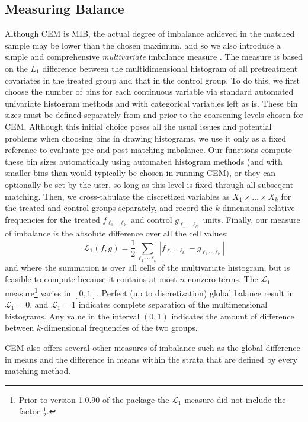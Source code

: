 \documentclass[article]{jss}
\begin{document}
\subsection{Measuring Balance}
Although CEM is MIB, the actual degree of imbalance achieved in the
matched sample may be lower than the chosen maximum, and so we also
introduce a simple and comprehensive \emph{multivariate} imbalance
measure \citep{IacKinPor08}.  The measure is based on the $L_1$
difference between the multidimensional histogram of all pretreatment
covariates in the treated group and that in the control group.  To do
this, we first choose the number of bins for each continuous variable
via standard automated univariate histogram methods and with
categorical variables left as is.  These bin sizes must be defined
separately from and prior to the coarsening levels chosen for CEM.
Although this initial choice poses all the usual issues and potential
problems when choosing bins in drawing histograms, we use it only as a
fixed reference to evaluate pre and post matching imbalance.  Our
functions compute these bin sizes automatically using automated
histogram methods (and with smaller bins than would typically be
chosen in running CEM), or they can optionally be set by the user, so
long as this level is fixed through all subseqent matching.  Then, we
cross-tabulate the discretized variables as $X_1\times \dots \times
X_k$ for the treated and control groups separately, and record the
$k$-dimensional relative frequencies for the treated $f_{\ell_1\cdots
  \ell_k}$ and control $g_{\ell_1\cdots \ell_k}$ units.  Finally, our
measure of imbalance is the absolute difference over all the cell
values:
\begin{equation}
  \mathcal L_1(f,g) = \frac12 \sum_{\ell_1  \cdots \ell_k} 
  |f_{\ell_1\cdots \ell_k} - g_{\ell_1\cdots \ell_k}|
  \label{eq:L1}
\end{equation}
and where the summation is over all cells of the multivariate
histogram, but is feasible to compute because it contains at most $n$
nonzero terms.  The $\mathcal L_1$ measure\footnote{Prior to version 1.0.90 of the  package the $\mathcal L_1$ measure did not include the factor $\frac12$.} varies in $[0,1]$.
Perfect (up to discretization) global balance result in $\mathcal
L_1=0$, and $\mathcal L_1=1$ indicates complete separation of the multimensional
histograms. Any value in the interval $(0,1)$  indicates the amount of difference  between $k$-dimensional frequencies of the
two groups. 

CEM also offers several other measures of imbalance such as the global
difference in means and the difference in means within the strata that
are defined by every matching method.
\end{document}
